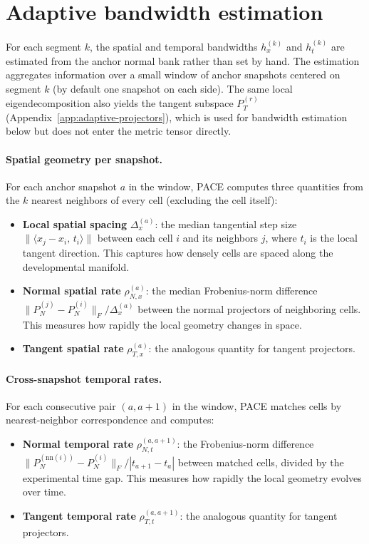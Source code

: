 \section{Adaptive bandwidth estimation}
\label{app:bandwidth}

For each segment $k$, the spatial and temporal bandwidths $h_x^{(k)}$ and $h_t^{(k)}$ are estimated from the anchor normal bank rather than set by hand. The estimation aggregates information over a small window of anchor snapshots centered on segment $k$ (by default one snapshot on each side). The same local eigendecomposition also yields the tangent subspace $P_T^{(r)}$ (Appendix~\ref{app:adaptive-projectors}), which is used for bandwidth estimation below but does not enter the metric tensor directly.

\paragraph{Spatial geometry per snapshot.}
For each anchor snapshot $a$ in the window, PACE computes three quantities from the $k$ nearest neighbors of every cell (excluding the cell itself):

\begin{itemize}
    \item \textbf{Local spatial spacing} $\Delta_x^{(a)}$: the median tangential step size $\|\langle x_j - x_i,\, t_i \rangle\|$ between each cell $i$ and its neighbors $j$, where $t_i$ is the local tangent direction. This captures how densely cells are spaced along the developmental manifold.
    \item \textbf{Normal spatial rate} $\rho_{N,x}^{(a)}$: the median Frobenius-norm difference $\|P_N^{(j)} - P_N^{(i)}\|_F / \Delta_x^{(a)}$ between the normal projectors of neighboring cells. This measures how rapidly the local geometry changes in space.
    \item \textbf{Tangent spatial rate} $\rho_{T,x}^{(a)}$: the analogous quantity for tangent projectors.
\end{itemize}

\paragraph{Cross-snapshot temporal rates.}
For each consecutive pair $(a, a+1)$ in the window, PACE matches cells by nearest-neighbor correspondence and computes:

\begin{itemize}
    \item \textbf{Normal temporal rate} $\rho_{N,t}^{(a,a+1)}$: the Frobenius-norm difference $\|P_N^{(\text{nn}(i))} - P_N^{(i)}\|_F / |t_{a+1} - t_a|$ between matched cells, divided by the experimental time gap. This measures how rapidly the local geometry evolves over time.
    \item \textbf{Tangent temporal rate} $\rho_{T,t}^{(a,a+1)}$: the analogous quantity for tangent projectors.
\end{itemize}

